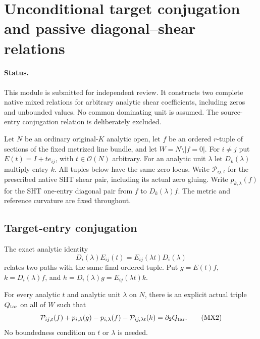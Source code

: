 \section{Unconditional target conjugation and passive diagonal--shear relations}
\label{sec:r10-native-mixed-relations}

\paragraph{Status.}
This module is submitted for independent review.  It constructs
two complete native mixed relations for arbitrary analytic
shear coefficients, including zeros and unbounded values.
No common dominating unit is assumed.  The source-entry
conjugation relation is deliberately excluded.

Let $N$ be an ordinary original-$K$ analytic open, let $f$ be an
ordered $r$-tuple of sections of the fixed metrized line bundle,
and let $W=N\setminus|f=0|$.  For $i\ne j$ put
$E(t)=I+t e_{ij}$, with $t\in\mathcal O(N)$ arbitrary.
For an analytic unit $\lambda$ let $D_k(\lambda)$ multiply
entry $k$.  All tuples below have the same zero locus.
Write $\mathcal P_{ij,t}$ for the prescribed native SHT shear
pair, including its actual zero gluing.  Write
$p_{k,\lambda}(f)$ for the SHT one-entry diagonal pair from
$f$ to $D_k(\lambda)f$.  The metric and reference curvature
are fixed throughout.

\subsection{Target-entry conjugation}

The exact analytic identity
\[
 D_i(\lambda)E_{ij}(t)
                 =E_{ij}(\lambda t)D_i(\lambda)                \tag{MX1}
\]
relates two paths with the same final ordered tuple.
Put $g=E(t)f$, $k=D_i(\lambda)f$, and
$h=D_i(\lambda)g=E_{ij}(\lambda t)k$.

\begin{theorem}
For every analytic $t$ and analytic unit $\lambda$ on $N$,
there is an explicit actual triple $Q_{\rm tar}$ on all of
$W$ such that
\[
 \mathcal P_{ij,t}(f)+p_{i,\lambda}(g)
       -p_{i,\lambda}(f)-\mathcal P_{ij,\lambda t}(k)
                                      =\partial_2Q_{\rm tar}.
                                                               \tag{MX2}
\]
No boundedness condition on $t$ or $\lambda$ is needed.
\end{theorem}

